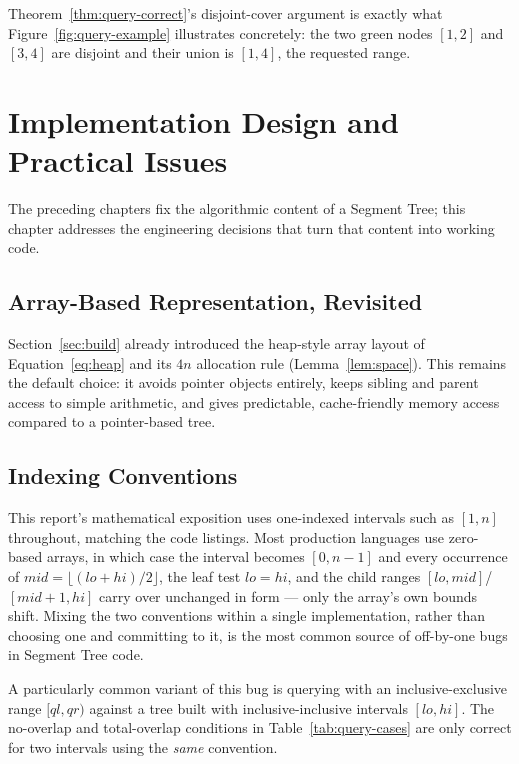\documentclass[
  11pt,
  a4paper,
  twoside=false,
  numbers=noenddot,
  headings=big,
  parskip=half,
  toc=bibliography,
  toc=listof,
  bibliography=totoc
]{scrreprt}
\newcounter{example}[chapter]
\begin{document}
\begin{remark}
Theorem~\ref{thm:query-correct}'s disjoint-cover argument is exactly what Figure~\ref{fig:query-example} illustrates concretely: the two green nodes $[1,2]$ and $[3,4]$ are disjoint and their union is $[1,4]$, the requested range.
\end{remark}

\chapter{Implementation Design and Practical Issues}
\label{ch:implementation}

The preceding chapters fix the algorithmic content of a Segment Tree; this chapter addresses the engineering decisions that turn that content into working code.

\section{Array-Based Representation, Revisited}
Section~\ref{sec:build} already introduced the heap-style array layout of Equation~\eqref{eq:heap} and its $4n$ allocation rule (Lemma~\ref{lem:space}). This remains the default choice: it avoids pointer objects entirely, keeps sibling and parent access to simple arithmetic, and gives predictable, cache-friendly memory access compared to a pointer-based tree.

\section{Indexing Conventions}
\label{sec:indexing}
This report's mathematical exposition uses one-indexed intervals such as $[1,n]$ throughout, matching the code listings. Most production languages use zero-based arrays, in which case the interval becomes $[0,n-1]$ and every occurrence of $mid=\lfloor(lo+hi)/2\rfloor$, the leaf test $lo=hi$, and the child ranges $[lo,mid]$/$[mid+1,hi]$ carry over unchanged in form --- only the array's own bounds shift. Mixing the two conventions within a single implementation, rather than choosing one and committing to it, is the most common source of off-by-one bugs in Segment Tree code.

\begin{pitfall}
A particularly common variant of this bug is querying with an inclusive-exclusive range $[ql,qr)$ against a tree built with inclusive-inclusive intervals $[lo,hi]$. The no-overlap and total-overlap conditions in Table~\ref{tab:query-cases} are only correct for two intervals using the \emph{same} convention.
\end{pitfall}
\end{document}
